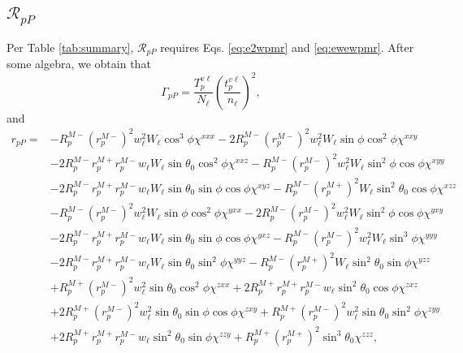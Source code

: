 
\subsection{\texorpdfstring{$\mathcal{R}_{pP}$}{RpP}}\label{sec:RpP} 

Per Table \ref{tab:summary}, $\mathcal{R}_{pP}$ requires Eqs. \eqref{eq:e2wpmr}
and \eqref{eq:ewewpmr}. After some algebra, we obtain that
\begin{equation}\label{eq:mc78}
\Gamma_{pP} =
\frac{T^{v\ell}_{p}}{N_{\ell}}
\left(\frac{t^{v\ell}_{p}}{n_{\ell}}\right)^{2}
,
\end{equation}
and
\begin{equation}
\begin{split}
r_{pP} =
&-R^{M-}_{p}\left(r^{M-}_{p}\right)^{2}w^{2}_{\ell}W_{\ell}\cos^{3}\phi
\chi^{xxx}
 -2R^{M-}_{p}\left(r^{M-}_{p}\right)^{2}w^{2}_{\ell}W_{\ell}\sin\phi\cos^{2}\phi
\chi^{xxy}\\
&-2R^{M-}_{p}r^{M+}_{p}r^{M-}_{p}w_{\ell}W_{\ell}\sin\theta_{0}\cos^{2}\phi
\chi^{xxz}
 -R^{M-}_{p}\left(r^{M-}_{p}\right)^{2}w^{2}_{\ell}W_{\ell}\sin^{2}\phi\cos\phi
\chi^{xyy}\\
&-2R^{M-}_{p}r^{M+}_{p}r^{M-}_{p}w_{\ell}W_{\ell}\sin\theta_{0}\sin\phi\cos\phi
\chi^{xyz}
 -R^{M-}_{p}\left(r^{M+}_{p}\right)^{2}W_{\ell}\sin^{2}\theta_{0}\cos\phi
\chi^{xzz}\\
&-R^{M-}_{p}\left(r^{M-}_{p}\right)^{2}w^{2}_{\ell}W_{\ell}\sin\phi\cos^{2}\phi
\chi^{yxx}
 -2R^{M-}_{p}\left(r^{M-}_{p}\right)^{2}w^{2}_{\ell}W_{\ell}\sin^{2}\phi\cos\phi
\chi^{yxy}\\
&-2R^{M-}_{p}r^{M+}_{p}r^{M-}_{p}w_{\ell}W_{\ell}\sin\theta_{0}\sin\phi\cos\phi
\chi^{yxz}
 -R^{M-}_{p}\left(r^{M-}_{p}\right)^{2}w^{2}_{\ell}W_{\ell}\sin^{3}\phi
\chi^{yyy}\\
&-2R^{M-}_{p}r^{M+}_{p}r^{M-}_{p}w_{\ell}W_{\ell}\sin\theta_{0}\sin^{2}\phi
\chi^{yyz}
 -R^{M-}_{p}\left(r^{M+}_{p}\right)^{2}W_{\ell}\sin^{2}\theta_{0}\sin\phi
\chi^{yzz}\\
&+R^{M+}_{p}\left(r^{M-}_{p}\right)^{2}w^{2}_{\ell}\sin\theta_{0}\cos^{2}\phi
\chi^{zxx}
 +2R^{M+}_{p}r^{M+}_{p}r^{M-}_{p}w_{\ell}\sin^{2}\theta_{0}\cos\phi
\chi^{zxz}\\
&+2R^{M+}_{p}\left(r^{M-}_{p}\right)^{2}w^{2}_{\ell}\sin\theta_{0}\sin\phi
\cos\phi\chi^{zxy}
 +R^{M+}_{p}\left(r^{M-}_{p}\right)^{2}w^{2}_{\ell}\sin\theta_{0}\sin^{2}\phi
\chi^{zyy}\\
&+2R^{M+}_{p}r^{M+}_{p}r^{M-}_{p}w_{\ell}\sin^{2}\theta_{0}\sin\phi
\chi^{zzy}
 +R^{M+}_{p}\left(r^{M+}_{p}\right)^{2}\sin^{3}\theta_{0}
\chi^{zzz}
,
\end{split}
\end{equation}
